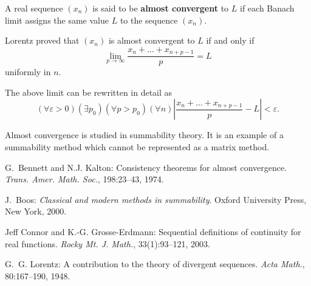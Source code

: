 \documentclass[12pt]{article}
\begin{document}
A real sequence $(x_n)$ is said to be \textbf{almost convergent} to $L$ if each Banach limit assigns
the same value $L$ to the sequence $(x_n)$.

Lorentz \cite{lorentz} proved that $(x_n)$ is almost convergent to $L$ if and only if
$$\lim\limits_{p\to\infty} \frac{x_{n}+\ldots+x_{n+p-1}}p=L$$
uniformly in $n$.

The above limit can be rewritten in detail as
$$(\forall \varepsilon>0) (\exists p_0) (\forall p>p_0) (\forall n) \left|\frac{x_{n}+\ldots+x_{n+p-1}}p-L\right|<\varepsilon.$$

Almost convergence is studied in summability theory. It is an example of a summability method
which cannot be represented as a matrix method.

\begin{thebibliography}{9}
G.~Bennett and N.J. Kalton: 
{Consistency theorems for almost convergence.}
\emph{Trans. Amer. Math. Soc.}, 198:23--43, 1974.

J.~Boos:
\emph{Classical and modern methods in summability}.
Oxford University Press, New York, 2000.

Jeff Connor and K.-G. Grosse-Erdmann:
{Sequential definitions of continuity for real functions.}
\emph{Rocky Mt. J. Math.}, 33(1):93--121, 2003.

G.~G. Lorentz:
A contribution to the theory of divergent sequences.
\emph{Acta Math.}, 80:167--190, 1948.
\end{thebibliography}
\end{document}

